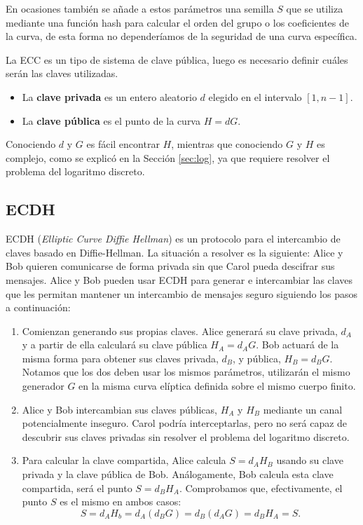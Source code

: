 \documentclass[11pt]{article}
\begin{document}
En ocasiones también se añade a estos parámetros una semilla $S$ que se utiliza mediante una función hash para calcular el orden del grupo o los coeficientes de la curva, de esta forma no dependeríamos de la seguridad de una curva específica.

La ECC es un tipo de sistema de clave pública, luego es necesario definir cuáles serán las claves utilizadas.

\begin{itemize}
\item La \textbf{clave privada} es un entero aleatorio $d$ elegido en el intervalo $[1,n-1]$.
\item La \textbf{clave pública} es el punto de la curva $H = dG$.
\end{itemize}

Conociendo $d$ y $G$ es fácil encontrar $H$, mientras que conociendo $G$ y $H$ es complejo, como se explicó en la Sección \ref{sec:log}, ya que requiere resolver el problema del logaritmo discreto.


\subsection{ECDH}
ECDH (\textit{Elliptic Curve Diffie Hellman}) es un protocolo para el intercambio de claves basado en Diffie-Hellman. La situación a resolver es la siguiente: Alice y Bob quieren comunicarse de forma privada sin que Carol pueda descifrar sus mensajes. Alice y Bob pueden usar ECDH para generar e intercambiar las claves que les permitan mantener un intercambio de mensajes seguro siguiendo los pasos a continuación:

\begin{enumerate}
\item Comienzan generando sus propias claves. Alice generará su clave privada, $d_A$ y a partir de ella calculará su clave pública $H_A = d_AG$. Bob actuará de la misma forma para obtener sus claves privada, $d_B$, y pública, $H_B = d_BG$. Notamos que los dos deben usar los mismos parámetros, utilizarán el mismo generador $G$ en la misma curva elíptica definida sobre el mismo cuerpo finito.

\item Alice y Bob intercambian sus claves públicas, $H_A$ y $H_B$ mediante un canal potencialmente inseguro. Carol podría interceptarlas, pero no será capaz de descubrir sus claves privadas sin resolver el problema del logaritmo discreto.\\
\item Para calcular la clave compartida, Alice calcula $S = d_AH_B$ usando su clave privada y la clave pública de Bob. Análogamente, Bob calcula esta clave compartida, será el punto $S = d_BH_A$. Comprobamos que, efectivamente, el punto $S$ es el mismo en ambos casos:
  \[S = d_AH_b = d_A(d_BG) = d_B(d_AG) = d_BH_A = S.\]
\end{enumerate}
\end{document}

